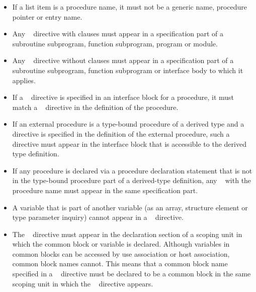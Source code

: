 \begin{fortranspecific}
\begin{itemize}
\item If a list item is a procedure name, it must not be a generic name,
      procedure pointer or entry name.

\item Any ~ directive with clauses must appear
      in a specification part of a subroutine subprogram, function subprogram,
      program or module.

\item Any ~ directive without clauses must appear
      in a specification part of a subroutine subprogram, function subprogram
      or interface body to which it applies.

\item If a ~ directive is specified in an
      interface block for a procedure, it must match a
      ~ directive in the definition of the
      procedure.

\item If an external procedure is a type-bound procedure of a derived
      type and a ~ directive is specified in
      the definition of the external procedure, such a directive must
      appear in the interface block that is accessible to the derived
      type definition.

\item If any procedure is declared via a procedure declaration statement
      that is not in the type-bound procedure part of a derived-type
      definition, any ~ with the procedure
      name must appear in the same specification part.

\item A variable that is part of another variable (as an array, structure
      element or type parameter inquiry) cannot appear in a
      ~ directive.

\item The ~ directive must appear in the
      declaration section of a scoping unit in which the common block
      or variable is declared. Although variables in common blocks can
      be accessed by use association or host association, common block
      names cannot. This means that a common block name specified in a
      ~ directive must be declared to be a
      common block in the same scoping unit in which the
      ~ directive appears.


\end{itemize}
\end{fortranspecific}
